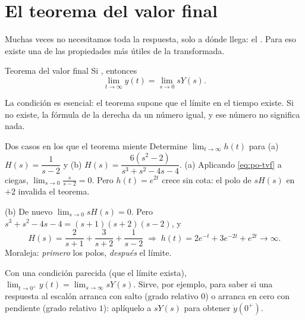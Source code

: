 \section{El teorema del valor final}
\label{sec:po-tvf}

Muchas veces no necesitamos toda la respuesta, solo a dónde llega: el . Para eso existe una de las propiedades más útiles de la transformada.

\begin{definicion}[label=def:po-tvf]{Teorema del valor final}
Si , entonces
\begin{equation}
  \lim_{t\to\infty}y(t)=\lim_{s\to0}sY(s).
  \label{eq:po-tvf}
\end{equation}
\end{definicion}

La condición es esencial: el teorema supone que el límite en el tiempo existe. Si no existe, la fórmula de la derecha da un número igual, y ese número no significa nada.

\begin{ejemplo}[label=ej:po-tvf]{Dos casos en los que el teorema miente}
Determine $\lim_{t\to\infty}h(t)$ para (a) $H(s)=\dfrac1{s-2}$ y (b) $H(s)=\dfrac{6(s^2-2)}{s^3+s^2-4s-4}$.
\solucion (a) Aplicando \eqref{eq:po-tvf} a ciegas, $\lim_{s\to0}\frac{s}{s-2}=0$. Pero $h(t)=e^{2t}$ crece sin cota: el polo de $sH(s)$ en $+2$ invalida el teorema.

(b) De nuevo $\lim_{s\to0}sH(s)=0$. Pero $s^3+s^2-4s-4=(s+1)(s+2)(s-2)$, y
\[
  H(s)=\frac{2}{s+1}+\frac{3}{s+2}+\frac{1}{s-2}\;\Longrightarrow\;h(t)=2e^{-t}+3e^{-2t}+e^{2t}\to\infty.
\]
Moraleja: \emph{primero} los polos, \emph{después} el límite.
\end{ejemplo}


\begin{profundiza}
Con una condición parecida (que el límite exista), $\displaystyle\lim_{t\to0^+}y(t)=\lim_{s\to\infty}sY(s)$. Sirve, por ejemplo, para saber si una respuesta al escalón arranca con salto (grado relativo $0$) o arranca en cero con pendiente (grado relativo $1$): aplíquelo a $sY(s)$ para obtener $\dot y(0^+)$.
\end{profundiza}
